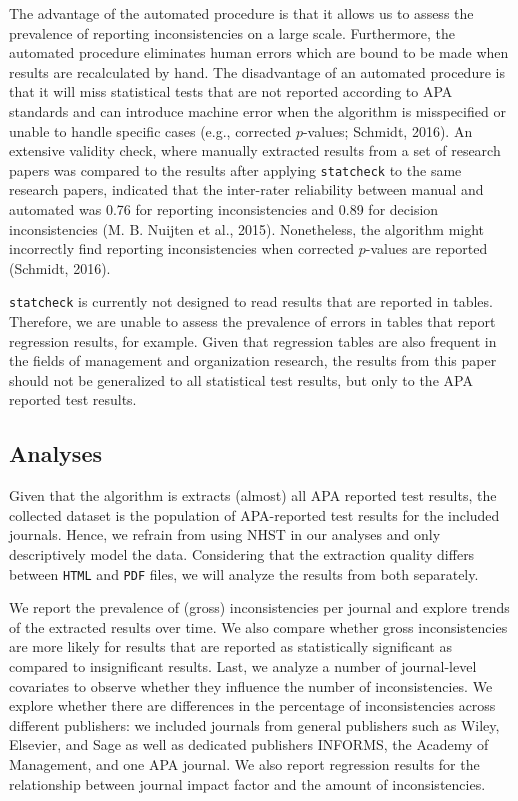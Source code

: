 \documentclass[english,floatsintext,man]{apa6}
\begin{document}
The advantage of the automated procedure is that it allows us to assess
the prevalence of reporting inconsistencies on a large scale.
Furthermore, the automated procedure eliminates human errors which are
bound to be made when results are recalculated by hand. The disadvantage
of an automated procedure is that it will miss statistical tests that
are not reported according to APA standards and can introduce machine
error when the algorithm is misspecified or unable to handle specific
cases (e.g., corrected \(p\)-values; Schmidt, 2016). An extensive
validity check, where manually extracted results from a set of research
papers was compared to the results after applying \texttt{statcheck} to
the same research papers, indicated that the inter-rater reliability
between manual and automated was 0.76 for reporting inconsistencies and
0.89 for decision inconsistencies (M. B. Nuijten et al., 2015).
Nonetheless, the algorithm might incorrectly find reporting
inconsistencies when corrected \(p\)-values are reported (Schmidt,
2016).

\texttt{statcheck} is currently not designed to read results that are
reported in tables. Therefore, we are unable to assess the prevalence of
errors in tables that report regression results, for example. Given that
regression tables are also frequent in the fields of management and
organization research, the results from this paper should not be
generalized to all statistical test results, but only to the APA
reported test results.

\subsection{Analyses}\label{analyses}

Given that the algorithm is extracts (almost) all APA reported test
results, the collected dataset is the population of APA-reported test
results for the included journals. Hence, we refrain from using NHST in
our analyses and only descriptively model the data. Considering that the
extraction quality differs between \texttt{HTML} and \texttt{PDF} files,
we will analyze the results from both separately.

We report the prevalence of (gross) inconsistencies per journal and
explore trends of the extracted results over time. We also compare
whether gross inconsistencies are more likely for results that are
reported as statistically significant as compared to insignificant
results. Last, we analyze a number of journal-level covariates to
observe whether they influence the number of inconsistencies. We explore
whether there are differences in the percentage of inconsistencies
across different publishers: we included journals from general
publishers such as Wiley, Elsevier, and Sage as well as dedicated
publishers INFORMS, the Academy of Management, and one APA journal. We
also report regression results for the relationship between journal
impact factor and the amount of inconsistencies.
\end{document}
